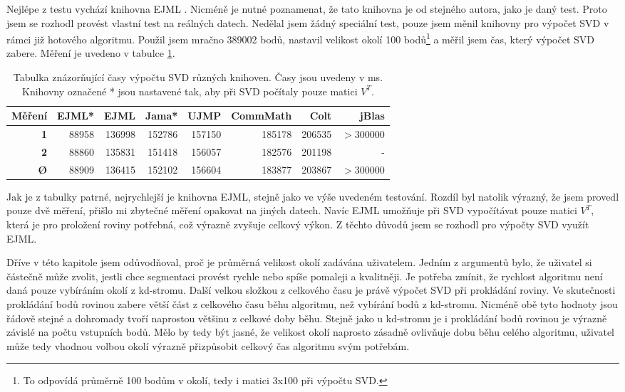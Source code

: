 \documentclass[11pt,twoside,a4paper]{book}
\begin{document}
Nejlépe z testu vychází knihovna EJML \cite{svdlib}. Nicméně je nutné poznamenat, že tato knihovna je od stejného autora, jako je daný test. Proto jsem se rozhodl provést vlastní test na reálných datech. Nedělal jsem žádný speciální test, pouze jsem měnil knihovny pro výpočet SVD v rámci již hotového algoritmu. Použil jsem mračno 389002 bodů, nastavil velikost okolí 100 bodů\footnote{To odpovídá průměrně 100 bodům v okolí, tedy i matici 3x100 při výpočtu SVD.} a měřil jsem čas, který výpočet SVD zabere. Měření je uvedeno v tabulce \ref{table:svdlib}.

\begin{table}[ht]
\resizebox{\textwidth}{!} {
\begin{tabular}{|r|r|r|r|r|r|r|r|}
\hline
\textbf{Měření} & \textbf{EJML*} & \textbf{EJML} & \textbf{Jama*} & \textbf{UJMP} & \textbf{CommMath} & \textbf{Colt} & \textbf{jBlas} \\ \hline
\textbf{1} & 88958 & 136998 & 152786 & 157150 & 185178 & 206535 & $>$300000 \\ \hline
\textbf{2} & 88860 & 135831 & 151418 & 156057 & 182576 & 201198 & - \\ \hline
\textbf{Ø} & 88909 & 136415 & 152102 & 156604 & 183877 & 203867 & $>$300000 \\ \hline
\end{tabular}
}
\caption{Tabulka znázorňující časy výpočtu SVD různých knihoven. Časy jsou uvedeny v ms. Knihovny označené * jsou nastavené tak, aby při SVD počítaly pouze matici $V^T$.} 
\label{table:svdlib}
\end{table}

Jak je z tabulky patrné, nejrychlejší je knihovna EJML, stejně jako ve výše uvedeném testování. Rozdíl byl natolik výrazný, že jsem provedl pouze dvě měření, přišlo mi zbytečné měření opakovat na jiných datech. Navíc EJML umožňuje při SVD vypočítávat pouze matici $V^T$, která je pro proložení roviny potřebná, což výrazně zvyšuje celkový výkon. Z těchto důvodů jsem se rozhodl pro výpočty SVD využít EJML.

Dříve v této kapitole jsem odůvodňoval, proč je průměrná velikost okolí zadávána uživatelem. Jedním z argumentů bylo, že uživatel si částečně může zvolit, jestli chce segmentaci provést rychle nebo spíše pomaleji a kvalitněji. Je potřeba zmínit, že rychlost algoritmu není daná pouze vybíráním okolí z kd-stromu. Další velkou složkou z celkového času je právě výpočet SVD při prokládání roviny. Ve skutečnosti prokládání bodů rovinou zabere větší část z celkového času běhu algoritmu, než vybírání bodů z kd-stromu. Nicméně obě tyto hodnoty jsou řádově stejné a dohromady tvoří naprostou většinu z celkové doby běhu. Stejně jako u kd-stromu je i prokládání bodů rovinou je výrazně závislé na počtu vstupních bodů. Mělo by tedy být jasné, že velikost okolí naprosto zásadně ovlivňuje dobu běhu celého algoritmu, uživatel může tedy vhodnou volbou okolí výrazně přizpůsobit celkový čas algoritmu svým potřebám.
\end{document}
